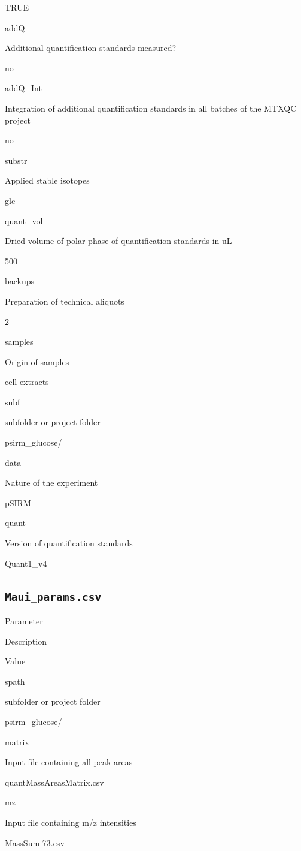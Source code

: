 \documentclass[]{book}
\theoremstyle{definition}
\theoremstyle{definition}
\theoremstyle{definition}
\theoremstyle{remark}
\begin{document}
TRUE

addQ

Additional quantification standards measured?

no

addQ\_Int

Integration of additional quantification standards in all batches of the
MTXQC project

no

substr

Applied stable isotopes

glc

quant\_vol

Dried volume of polar phase of quantification standards in uL

500

backups

Preparation of technical aliquots

2

samples

Origin of samples

cell extracts

subf

subfolder or project folder

psirm\_glucose/

data

Nature of the experiment

pSIRM

quant

Version of quantification standards

Quant1\_v4

\subsection{\texorpdfstring{\texttt{Maui\_params.csv}}{Maui\_params.csv}}\label{maui_params.csv}

Parameter

Description

Value

spath

subfolder or project folder

psirm\_glucose/

matrix

Input file containing all peak areas

quantMassAreasMatrix.csv

mz

Input file containing m/z intensities

MassSum-73.csv
\end{document}
